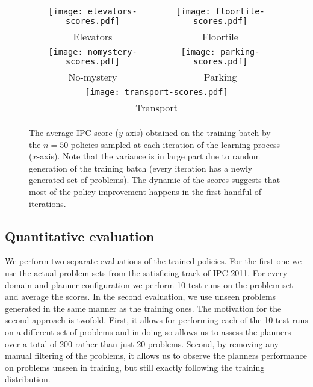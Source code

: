 \documentclass[letterpaper]{article} %
\begin{document}
\begin{figure*}
    \centering
    \begin{tabular}{cc}
         \texttt{[image: elevators-scores.pdf]} & \texttt{[image: floortile-scores.pdf]} \\
         Elevators\vspace{2ex} & Floortile \\
         \texttt{[image: nomystery-scores.pdf]} &
         \texttt{[image: parking-scores.pdf]} \\
         No-mystery\vspace{2ex} & Parking \\
         \multicolumn{2}{c}{\texttt{[image: transport-scores.pdf]}}\\
         \multicolumn{2}{c}{Transport\vspace{2ex}}\\
    \end{tabular}
    \caption{The average IPC score ($y$-axis) obtained on the training batch by the $n=50$ policies sampled at each iteration of the learning process ($x$-axis). Note that the variance is in large part due to random generation of the training batch (every iteration has a newly generated set of problems). The dynamic of the scores suggests that most of the policy improvement happens in the first handful of iterations.}
    \label{fig:training}
\end{figure*}

\subsection{Quantitative evaluation}

We perform two separate evaluations of the trained policies. For the first one we use the actual problem sets from the satisficing track of IPC 2011. For every domain and planner configuration we perform 10 test runs on the problem set and average the scores. In the second evaluation, we use unseen problems generated in the same manner as the training ones. The motivation for the second approach is twofold. First, it allows for performing each of the 10 test runs on a different set of problems and in doing so allows us to assess the planners over a total of 200 rather than just 20 problems. Second, by removing any manual filtering of the problems, it allows us to observe the planners performance on problems unseen in training, but still exactly following the training distribution.
\end{document}
